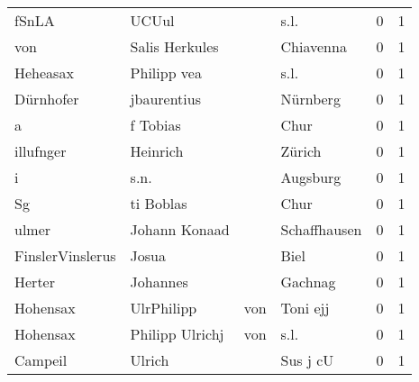 \begin{tabular}{llllrr}
                    fSnLA &                              UCUul &             &                                        s.l. &          0 &         1 \\
                      von &                     Salis Herkules &             &                                   Chiavenna &          0 &         1 \\
                 Heheasax &                        Philipp vea &             &                                        s.l. &          0 &         1 \\
                Dürnhofer &                        jbaurentius &             &                                    Nürnberg &          0 &         1 \\
                        a &                           f Tobias &             &                                        Chur &          0 &         1 \\
                illufnger &                           Heinrich &             &                                      Zürich &          0 &         1 \\
                        i &                               s.n. &             &                                    Augsburg &          0 &         1 \\
                       Sg &                          ti Boblas &             &                                        Chur &          0 &         1 \\
                    ulmer &                      Johann Konaad &             &                                Schaffhausen &          0 &         1 \\
         FinslerVinslerus &                              Josua &             &                                        Biel &          0 &         1 \\
                   Herter &                           Johannes &             &                                     Gachnag &          0 &         1 \\
                 Hohensax &                         UlrPhilipp &         von &                                    Toni ejj &          0 &         1 \\
                 Hohensax &                    Philipp Ulrichj &         von &                                        s.l. &          0 &         1 \\
                  Campeil &                             Ulrich &             &                                    Sus j cU &          0 &         1 \\

\end{tabular}
